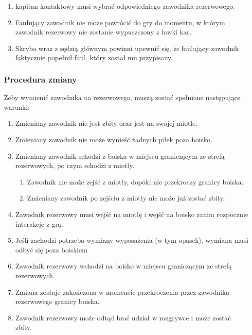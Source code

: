 \documentclass[12pt]{article}
\begin{document}
\begin{enumerate}
\begin{enumerate}
    \begin{enumerate}
    \item
            kapitan kontaktowy musi wybrać odpowiedniego zawodnika
      rezerwowego.
          \item
            Faulujący zawodnik nie może powrócić do gry do momentu, w którym
      zawodnik rezerwowy nie zostanie wypuszczony z ławki kar.
          \item
            Skryba wraz z sędzią głównym powinni upewnić się, że faulujący
      zawodnik faktycznie popełnił faul, który został mu przypisany.
          \end{enumerate}
  \end{enumerate}
\end{enumerate}

\subsubsection{Procedura zmiany}

Żeby wymienić zawodnika na rezerwowego, muszą zostać spełnione
następujące warunki:

\begin{enumerate}
\item
  Zmieniany zawodnik nie jest zbity oraz jest na swojej miotle.
\item
  Zmieniany zawodnik nie może wynieść żadnych piłek poza boisko.
\item
  Zmieniany zawodnik schodzi z boiska w miejscu graniczącym ze strefą
  rezerwowych, po czym schodzi z miotły.

  \begin{enumerate}
  \item
        Zawodnik nie może zejść z miotły, dopóki nie przekroczy granicy
    boiska.
      \item
        Zmieniany zawodnik po zejściu z miotły nie może już zostać zbity.
      \end{enumerate}
\item
    Zawodnik rezerwowy musi wejść na miotłę i wejść na boisko zanim
  rozpocznie interakcje z grą.
  \item
  Jeśli zachodzi potrzeba wymiany wyposażenia (w tym opasek), wymiana
  musi odbyć się poza boiskiem
\item
  Zawodnik rezerwowy wchodzi na boisko w miejscu graniczącym ze strefą
  rezerwowych.
\item
    Zmiana zostaje zakończona w momencie przekroczenia przez zawodnika
  rezerwowego granicy boiska.
  \item
  Zawodnik rezerwowy może odtąd brać udział w rozgrywce i może zostać
  zbity.
\end{enumerate}
\end{document}
